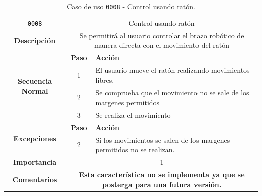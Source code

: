 \begin{table}[H]
    \centering
    \begin{tabularx}{\textwidth}{|c|c|X|}
        \cline{1-3}
        \texttt{0008}        & \multicolumn{2}{c|}{Control usando ratón}                                      
        \\ \cline{1-3}
        \textbf{Descripción} & \multicolumn{2}{m{13cm}|}{Se permitirá al usuario controlar el brazo robótico de manera directa con el movimiento del ratón}
        \\ \cline{1-3}
        \multirow{4}{*}{\textbf{Secuencia Normal}} & \textbf{Paso} & \textbf{Acción}
        \\ \cline{2-3}                    &   1  & El usuario mueve el ratón realizando movimientos libres.
        \\ \cline{2-3}                    &   2  & Se comprueba que el movimiento no se sale de los margenes permitidos
        \\ \cline{2-3}                    &   3  & Se realiza el movimiento
        \\ \cline{1-3}
        \multirow{2}{*}{\textbf{Excepciones}} & \textbf{Paso} & \textbf{Acción}
        \\ \cline{2-3}                    &   2   &  Si los movimientos se salen de los margenes permitidos no se realizan.
        \\ \cline{1-3}
        \textbf{Importancia}                 & \multicolumn{2}{c|}{1}           
        \\ \cline{1-3}
        \textbf{Comentarios}                 & \multicolumn{2}{m{13cm}|}{\textbf{Esta característica no se implementa ya que se posterga para una futura versión.}}
        \\ \cline{1-3}
    \end{tabularx}
    \caption{Caso de uso \texttt{0008} - Control usando ratón.}
    \label{tab:CU0008}
    \label{tab:caso_de_uso_control_usando_ratón}
\end{table}

